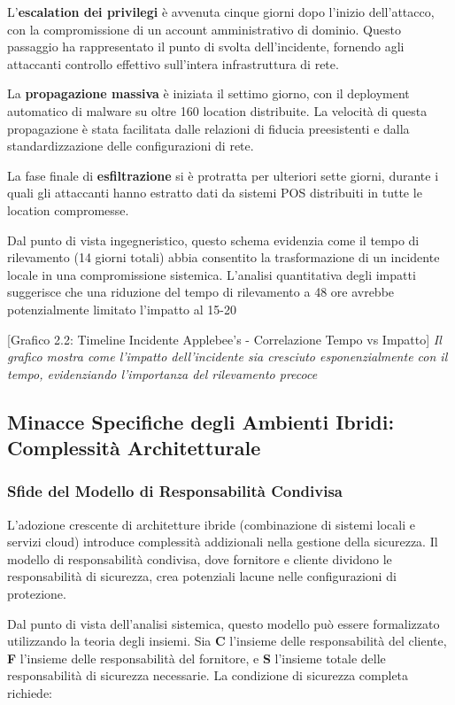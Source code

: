 {L'\textbf{escalation dei privilegi} è avvenuta cinque giorni dopo l'inizio dell'attacco, con la compromissione di un account amministrativo di dominio. Questo passaggio ha rappresentato il punto di svolta dell'incidente, fornendo agli attaccanti controllo effettivo sull'intera infrastruttura di rete.

La \textbf{propagazione massiva} è iniziata il settimo giorno, con il deployment automatico di malware su oltre 160 location distribuite. La velocità di questa propagazione è stata facilitata dalle relazioni di fiducia preesistenti e dalla standardizzazione delle configurazioni di rete.

La fase finale di \textbf{esfiltrazione} si è protratta per ulteriori sette giorni, durante i quali gli attaccanti hanno estratto dati da sistemi POS distribuiti in tutte le location compromesse.

Dal punto di vista ingegneristico, questo schema evidenzia come il tempo di rilevamento (14 giorni totali) abbia consentito la trasformazione di un incidente locale in una compromissione sistemica. L'analisi quantitativa degli impatti suggerisce che una riduzione del tempo di rilevamento a 48 ore avrebbe potenzialmente limitato l'impatto al 15-20%

[Grafico 2.2: Timeline Incidente Applebee's - Correlazione Tempo vs Impatto]
\textit{Il grafico mostra come l'impatto dell'incidente sia cresciuto esponenzialmente con il tempo, evidenziando l'importanza del rilevamento precoce}

\subsection{Minacce Specifiche degli Ambienti Ibridi: Complessità Architetturale}

\subsubsection{Sfide del Modello di Responsabilità Condivisa}

L'adozione crescente di architetture ibride (combinazione di sistemi locali e servizi cloud) introduce complessità addizionali nella gestione della sicurezza. Il modello di responsabilità condivisa, dove fornitore e cliente dividono le responsabilità di sicurezza, crea potenziali lacune nelle configurazioni di protezione.

Dal punto di vista dell'analisi sistemica, questo modello può essere formalizzato utilizzando la teoria degli insiemi. Sia \textbf{C} l'insieme delle responsabilità del cliente, \textbf{F} l'insieme delle responsabilità del fornitore, e \textbf{S} l'insieme totale delle responsabilità di sicurezza necessarie. La condizione di sicurezza completa richiede:

}
